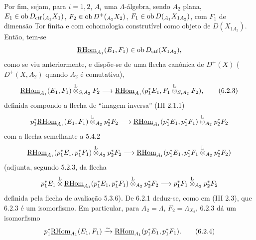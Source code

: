 Por fim, sejam, para $i=1,2$, $A_i$ uma $\Lambda$-álgebra, sendo $A_2$ plana, $E_1\in\operatorname{ob} D_{\mathrm{ctf}}({}_{A_1}X_1)$, $F_2\in\operatorname{ob} D^+({}_{A_2}X_2)$, $F_1\in\operatorname{ob} D({}_{A_1}X_{1A_2})$, com $F_1$ de dimensão Tor finita e com cohomologia construtível como objeto de $D(X_{1A_2})$. Então, tem-se
\[
\underline{\mathrm{RHom}}_{A_1}(E_1,F_1)\in\operatorname{ob} D_{\mathrm{ctf}}(X_{1A_2}),
\]
como se viu anteriormente, e dispõe-se de uma flecha canônica de $D^+(X)$ ($D^+(X,A_2)$ quando $A_2$ é comutativa),
\begin{equation}
\underline{\mathrm{RHom}}_{A_1}(E_1,F_1)\overset{\mathrm L}{\otimes}_{S,A_2}F_2
\longrightarrow
\underline{\mathrm{RHom}}_{A_1}(p_1^*E_1,F_1\overset{\mathrm L}{\otimes}_{S,A_2}F_2),
\tag{6.2.3}
\end{equation}
definida compondo a flecha de ``imagem inversa'' (III 2.1.1)
\[
p_1^*\underline{\mathrm{RHom}}_{A_1}(E_1,F_1)\overset{\mathrm L}{\otimes}_{A_2}p_2^*F_2
\longrightarrow
\underline{\mathrm{RHom}}_{A_1}(p_1^*E_1,p_1^*F_1)\overset{\mathrm L}{\otimes}_{A_2}p_2^*F_2
\]
com a flecha semelhante a 5.4.2
\[
\underline{\mathrm{RHom}}_{A_1}(p_1^*E_1,p_1^*F_1)\overset{\mathrm L}{\otimes}_{A_2}p_2^*F_2
\longrightarrow
\underline{\mathrm{RHom}}_{A_1}(p_1^*E_1,p_1^*F_1\overset{\mathrm L}{\otimes}_{A_2}p_2^*F_2)
\]
(adjunta, segundo 5.2.3, da flecha
\[
p_1^*E_1\overset{\mathrm L}{\otimes}\underline{\mathrm{RHom}}_{A_1}(p_1^*E_1,p_1^*F_1)\overset{\mathrm L}{\otimes}_{A_2}p_2^*F_2
\longrightarrow
p_1^*F_1\overset{\mathrm L}{\otimes}_{A_2}p_2^*F_2
\]
definida pela flecha de avaliação 5.3.6). De 6.2.1 deduz-se, como em (III 2.3), que 6.2.3 é um isomorfismo. Em particular, para $A_2=\Lambda$, $F_2=\Lambda_{X_2}$, 6.2.3 dá um isomorfismo
\begin{equation}
p_1^*\underline{\mathrm{RHom}}_{A_1}(E_1,F_1)
\xrightarrow{\sim}
\underline{\mathrm{RHom}}_{A_1}(p_1^*E_1,p_1^*F_1).
\tag{6.2.4}
\end{equation}
